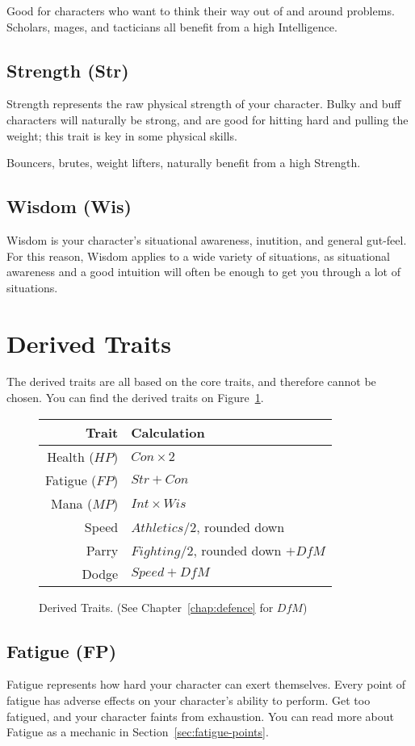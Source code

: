 Good for characters who want to think their way out of and around problems.
Scholars, mages, and tacticians all benefit from a high Intelligence.

\subsection{Strength (Str)}
Strength represents the raw physical strength of your character.
Bulky and buff characters will naturally be strong, and are good for hitting hard and pulling the weight; this trait is key in some physical skills.

Bouncers, brutes, weight lifters, naturally benefit from a high Strength.

\subsection{Wisdom (Wis)}
Wisdom is your character's situational awareness, inutition, and general gut-feel.
For this reason, Wisdom applies to a wide variety of situations, as situational awareness and a good intuition will often be enough to get you through a lot of situations.

\section{Derived Traits}
The derived traits are all based on the core traits, and therefore cannot be chosen. You can find the derived traits on Figure~\ref{fig:derived_traits}.

\begin{figure}[!ht]
    \centering
\begin{tabular}{r | l}
    \textbf{Trait} & \textbf{Calculation} \\\hline
    Health  ($HP$) & $Con\times 2$ \\
    Fatigue ($FP$) & $Str + Con$ \\
    Mana    ($MP$) & $Int\times Wis$ \\
    Speed          & $Athletics / 2$, rounded down\\
    Parry          & $Fighting/2$, rounded down $+ \mathit{DfM}$\\
    Dodge          & $Speed + \mathit{DfM}$
\end{tabular}
    \caption{Derived Traits. (See Chapter~\ref{chap:defence} for $\mathit{DfM}$)}
    \label{fig:derived_traits}
\end{figure}

\subsection{Fatigue (FP)}
Fatigue represents how hard your character can exert themselves.
Every point of fatigue has adverse effects on your character's ability to perform.
Get too fatigued, and your character faints from exhaustion.
You can read more about Fatigue as a mechanic in Section~\ref{sec:fatigue-points}.

